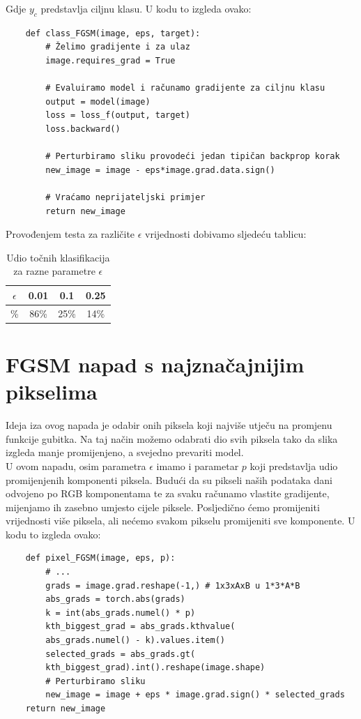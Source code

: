 Gdje $y_c$ predstavlja ciljnu klasu. U kodu to izgleda ovako:

\begin{verbatim}
    def class_FGSM(image, eps, target):
        # Želimo gradijente i za ulaz
        image.requires_grad = True

        # Evaluiramo model i računamo gradijente za ciljnu klasu
        output = model(image)
        loss = loss_f(output, target)
        loss.backward()

        # Perturbiramo sliku provodeći jedan tipičan backprop korak
        new_image = image - eps*image.grad.data.sign()

        # Vraćamo neprijateljski primjer
        return new_image
\end{verbatim}

Provođenjem testa za različite $\epsilon$ vrijednosti dobivamo sljedeću tablicu:

\begin{table}[H]
	\centering
	\begin{tabular}{||c || c | c | c||} 
		\hline
		$\epsilon$ & 0.01 & 0.1 & 0.25 \\ [0.5ex] 
		\hline\hline
		\% & 86\% & 25\% & 14\% \\ 
		\hline
	\end{tabular}
	\caption{Udio točnih klasifikacija za razne parametre $\epsilon$}
\end{table}


\section{FGSM napad s najznačajnijim pikselima}

Ideja iza ovog napada je odabir onih piksela koji najviše utječu na promjenu funkcije gubitka. Na taj način možemo odabrati dio svih piksela tako da slika izgleda manje promijenjeno, a svejedno prevariti model. \\
U ovom napadu, osim parametra $\epsilon$ imamo i parametar $p$ koji predstavlja udio promijenjenih komponenti piksela. Budući da su pikseli naših podataka dani odvojeno po RGB komponentama te za svaku računamo vlastite gradijente, mijenjamo ih zasebno umjesto cijele piksele. Posljedično ćemo promijeniti vrijednosti više piksela, ali nećemo svakom pikselu promijeniti sve komponente. U kodu to izgleda ovako:
\begin{verbatim}
    def pixel_FGSM(image, eps, p):
        # ...
        grads = image.grad.reshape(-1,) # 1x3xAxB u 1*3*A*B
        abs_grads = torch.abs(grads)
        k = int(abs_grads.numel() * p)
        kth_biggest_grad = abs_grads.kthvalue(
        abs_grads.numel() - k).values.item()
        selected_grads = abs_grads.gt(
        kth_biggest_grad).int().reshape(image.shape)
        # Perturbiramo sliku
        new_image = image + eps * image.grad.sign() * selected_grads
    return new_image
\end{verbatim}


